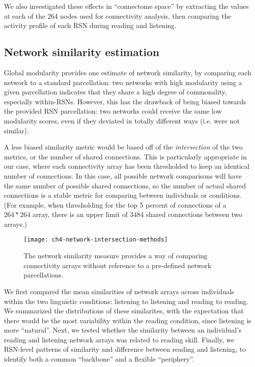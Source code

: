 We also investigated these effects in ``connectome space'' by extracting the values at each of the 264 nodes used for connectivity analysis, then comparing the activity profile of each RSN during reading and listening.


\subsection{Network similarity estimation}

Global modularity provides one estimate of network similarity, by comparing each network to a standard parcellation: two networks with high modularity using a given parcellation indicates that they share a high degree of commonality, especially within-RSNs. However, this has the drawback of being biased towards the provided RSN parcellation: two networks could receive the same low modularity scores, even if they deviated in totally different ways (i.e. were not similar). 

A less biased similarity metric would be based off of the \textit{intersection} of the two metrics, or the number of shared connections. This is particularly appropriate in our case, where each connectivity array has been thresholded to keep an identical number of connections. In this case, all possible network comparisons will have the same number of possible shared connections, so the number of actual shared connections is a stable metric for comparing between individuals or conditions. (For example, when thresholding for the top 5 percent of connections of a $264 * 264$ array, there is an upper limit of 3484 shared connections between two arrays.) 

\begin{figure}[t]
	\centering
	\texttt{[image: ch4-network-intersection-methods]}
    \caption[Method for comparing connectivity arrays.]{The network similarity measure provides a way of comparing connectivity arrays without reference to a pre-defined network parcellations.}
	\label{fig:ch4-network-intersection-methods}
\end{figure}

We first compared the mean similarities of network arrays across individuals within the two linguistic conditions: listening to listening and reading to reading. We summarized the distributions of these similarites, with the expectation that there would be the most variability within the reading condition, since listening is more ``natural''. Next, we tested whether the similarity between an individual's reading and listening network arrays was related to reading skill. Finally, we RSN-level patterns of similarity and difference between reading and listening, to identify both a common ``backbone'' and a flexible ``periphery''. 

